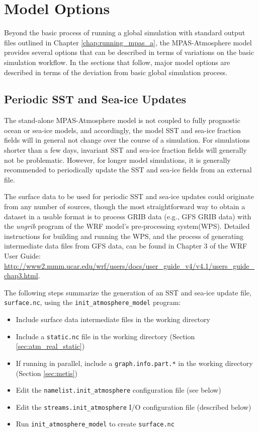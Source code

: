 \chapter{Model Options}
\label{chap:mpas_options}

Beyond the basic process of running a global simulation with standard output files outlined
in Chapter \ref{chap:running_mpas_a}, the MPAS-Atmosphere model provides several options
that can be described in terms of variations on the basic simulation workflow. In the sections
that follow, major model options are described in terms of the deviation from basic global
simulation process.


\section{Periodic SST and Sea-ice Updates}
\label{sec:sst_update}

The stand-alone MPAS-Atmosphere model is not coupled to fully prognostic ocean or sea-ice models,
and accordingly, the model SST and sea-ice fraction fields will in general not change over
the course of a simulation. For simulations shorter than a few days, invariant SST and sea-ice
fraction fields will generally not be problematic. However, for longer model simulations, it is
generally recommended to periodically update the SST and sea-ice fields from an external file.

The surface data to be used for periodic SST and sea-ice updates could originate from any number
of sources, though the most straightforward way to obtain a dataset in a usable format is to process
GRIB data (e.g., GFS GRIB data) with the {\em ungrib} program of the WRF model's pre-processing system(WPS).
Detailed instructions for building and running the WPS, and the process of generating intermediate data
files from GFS data, can be found in Chapter 3 of the WRF User Guide:
\url{http://www2.mmm.ucar.edu/wrf/users/docs/user_guide_v4/v4.1/users_guide_chap3.html}.

The following steps summarize the generation of an SST and sea-ice update file, {\tt surface.nc}, using
the {\tt init\_atmosphere\_model} program:

\begin{itemize}
\item Include surface data intermediate files in the working directory
\item Include a {\tt static.nc} file in the working directory (Section \ref{sec:atm_real_static})
\item If running in parallel, include a {\tt graph.info.part.*} in the working directory (Section \ref{sec:metis})
\item Edit the {\tt namelist.init\_atmosphere} configuration file (see below)
\item Edit the {\tt streams.init\_atmosphere} I/O configuration file (described below)
\item Run {\tt init\_atmosphere\_model} to create {\tt surface.nc}
\end{itemize}


